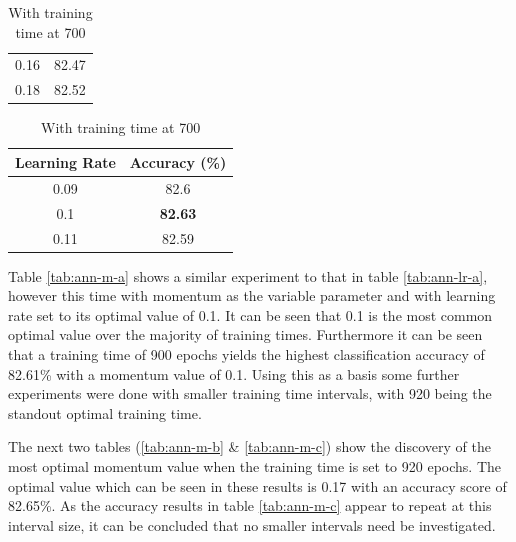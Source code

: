 \documentclass[12pt]{article}
\begin{document}
\begin{table}[H]
\begin{subtable}{.49\linewidth}
\begin{tabular}{c|c}
            0.16  & 82.47 \\
            0.18  & 82.52 \\
            \bottomrule
          \end{tabular}
          \label{tab:ann-lr-c}
        \end{subtable}
        \begin{subtable}{.49\linewidth}
          \centering
          \caption{With training time at 700}
          \begin{tabular}{c|c}
            \toprule
            \multicolumn{1}{l|}{Learning Rate} & \multicolumn{1}{l}{Accuracy (\%)} \\
            \midrule
            0.09  & 82.6 \\
            0.1   & \textbf{82.63} \\
            0.11  & 82.59 \\
            \bottomrule
          \end{tabular}
          \label{tab:ann-lr-d}
        \end{subtable}
        \label{tab:ann-lr}
      \end{table}
      \onehalfspacing

      Table \ref{tab:ann-m-a} shows a similar experiment to that in table \ref{tab:ann-lr-a}, however this time with momentum as the variable parameter and with learning rate set to its optimal value of 0.1. It can be seen that 0.1 is the most common optimal value over the majority of training times. Furthermore it can be seen that a training time of 900 epochs yields the highest classification accuracy of 82.61\% with a momentum value of 0.1. Using this as a basis some further experiments were done with smaller training time intervals, with 920 being the standout optimal training time.

      The next two tables (\ref{tab:ann-m-b} \& \ref{tab:ann-m-c}) show the discovery of the most optimal momentum value when the training time is set to 920 epochs. The optimal value which can be seen in these results is 0.17 with an accuracy score of 82.65\%. As the accuracy results in table \ref{tab:ann-m-c} appear to repeat at this interval size, it can be concluded that no smaller intervals need be investigated.
\end{document}
